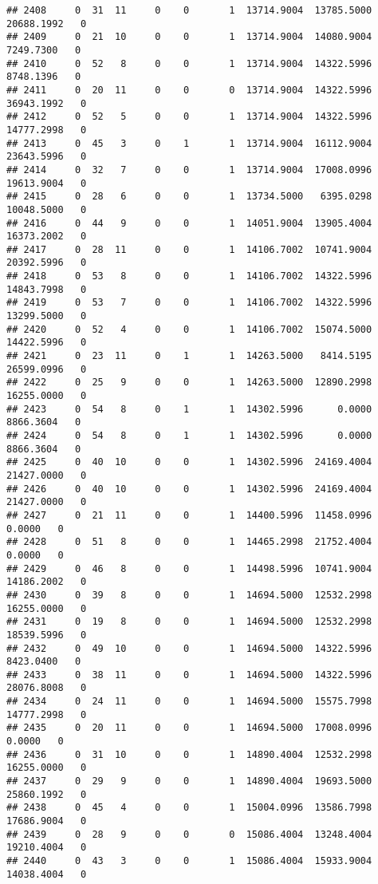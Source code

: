 \documentclass[
]{article}
\begin{document}
\begin{enumerate}
\begin{verbatim}
## 2408     0  31  11     0    0       1  13714.9004  13785.5000  20688.1992   0
## 2409     0  21  10     0    0       1  13714.9004  14080.9004   7249.7300   0
## 2410     0  52   8     0    0       1  13714.9004  14322.5996   8748.1396   0
## 2411     0  20  11     0    0       0  13714.9004  14322.5996  36943.1992   0
## 2412     0  52   5     0    0       1  13714.9004  14322.5996  14777.2998   0
## 2413     0  45   3     0    1       1  13714.9004  16112.9004  23643.5996   0
## 2414     0  32   7     0    0       1  13714.9004  17008.0996  19613.9004   0
## 2415     0  28   6     0    0       1  13734.5000   6395.0298  10048.5000   0
## 2416     0  44   9     0    0       1  14051.9004  13905.4004  16373.2002   0
## 2417     0  28  11     0    0       1  14106.7002  10741.9004  20392.5996   0
## 2418     0  53   8     0    0       1  14106.7002  14322.5996  14843.7998   0
## 2419     0  53   7     0    0       1  14106.7002  14322.5996  13299.5000   0
## 2420     0  52   4     0    0       1  14106.7002  15074.5000  14422.5996   0
## 2421     0  23  11     0    1       1  14263.5000   8414.5195  26599.0996   0
## 2422     0  25   9     0    0       1  14263.5000  12890.2998  16255.0000   0
## 2423     0  54   8     0    1       1  14302.5996      0.0000   8866.3604   0
## 2424     0  54   8     0    1       1  14302.5996      0.0000   8866.3604   0
## 2425     0  40  10     0    0       1  14302.5996  24169.4004  21427.0000   0
## 2426     0  40  10     0    0       1  14302.5996  24169.4004  21427.0000   0
## 2427     0  21  11     0    0       1  14400.5996  11458.0996      0.0000   0
## 2428     0  51   8     0    0       1  14465.2998  21752.4004      0.0000   0
## 2429     0  46   8     0    0       1  14498.5996  10741.9004  14186.2002   0
## 2430     0  39   8     0    0       1  14694.5000  12532.2998  16255.0000   0
## 2431     0  19   8     0    0       1  14694.5000  12532.2998  18539.5996   0
## 2432     0  49  10     0    0       1  14694.5000  14322.5996   8423.0400   0
## 2433     0  38  11     0    0       1  14694.5000  14322.5996  28076.8008   0
## 2434     0  24  11     0    0       1  14694.5000  15575.7998  14777.2998   0
## 2435     0  20  11     0    0       1  14694.5000  17008.0996      0.0000   0
## 2436     0  31  10     0    0       1  14890.4004  12532.2998  16255.0000   0
## 2437     0  29   9     0    0       1  14890.4004  19693.5000  25860.1992   0
## 2438     0  45   4     0    0       1  15004.0996  13586.7998  17686.9004   0
## 2439     0  28   9     0    0       0  15086.4004  13248.4004  19210.4004   0
## 2440     0  43   3     0    0       1  15086.4004  15933.9004  14038.4004   0

\end{verbatim}
\end{enumerate}
\end{document}
